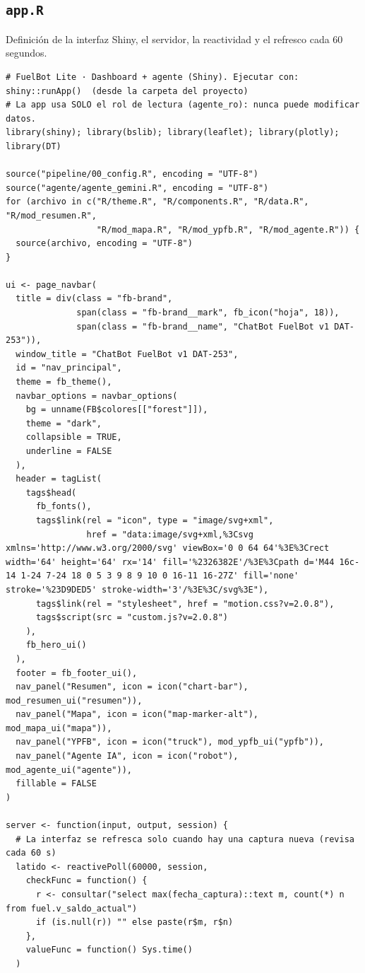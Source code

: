 \subsection{\texttt{app.R}}
Definición de la interfaz Shiny, el servidor, la reactividad y el refresco cada 60 segundos.
\begin{lstlisting}[style=anexoR]
# FuelBot Lite · Dashboard + agente (Shiny). Ejecutar con: shiny::runApp()  (desde la carpeta del proyecto)
# La app usa SOLO el rol de lectura (agente_ro): nunca puede modificar datos.
library(shiny); library(bslib); library(leaflet); library(plotly); library(DT)

source("pipeline/00_config.R", encoding = "UTF-8")
source("agente/agente_gemini.R", encoding = "UTF-8")
for (archivo in c("R/theme.R", "R/components.R", "R/data.R", "R/mod_resumen.R",
                  "R/mod_mapa.R", "R/mod_ypfb.R", "R/mod_agente.R")) {
  source(archivo, encoding = "UTF-8")
}

ui <- page_navbar(
  title = div(class = "fb-brand",
              span(class = "fb-brand__mark", fb_icon("hoja", 18)),
              span(class = "fb-brand__name", "ChatBot FuelBot v1 DAT-253")),
  window_title = "ChatBot FuelBot v1 DAT-253",
  id = "nav_principal",
  theme = fb_theme(),
  navbar_options = navbar_options(
    bg = unname(FB$colores[["forest"]]),
    theme = "dark",
    collapsible = TRUE,
    underline = FALSE
  ),
  header = tagList(
    tags$head(
      fb_fonts(),
      tags$link(rel = "icon", type = "image/svg+xml",
                href = "data:image/svg+xml,%3Csvg xmlns='http://www.w3.org/2000/svg' viewBox='0 0 64 64'%3E%3Crect width='64' height='64' rx='14' fill='%2326382E'/%3E%3Cpath d='M44 16c-14 1-24 7-24 18 0 5 3 9 8 9 10 0 16-11 16-27Z' fill='none' stroke='%23D9DED5' stroke-width='3'/%3E%3C/svg%3E"),
      tags$link(rel = "stylesheet", href = "motion.css?v=2.0.8"),
      tags$script(src = "custom.js?v=2.0.8")
    ),
    fb_hero_ui()
  ),
  footer = fb_footer_ui(),
  nav_panel("Resumen", icon = icon("chart-bar"), mod_resumen_ui("resumen")),
  nav_panel("Mapa", icon = icon("map-marker-alt"), mod_mapa_ui("mapa")),
  nav_panel("YPFB", icon = icon("truck"), mod_ypfb_ui("ypfb")),
  nav_panel("Agente IA", icon = icon("robot"), mod_agente_ui("agente")),
  fillable = FALSE
)

server <- function(input, output, session) {
  # La interfaz se refresca solo cuando hay una captura nueva (revisa cada 60 s)
  latido <- reactivePoll(60000, session,
    checkFunc = function() {
      r <- consultar("select max(fecha_captura)::text m, count(*) n from fuel.v_saldo_actual")
      if (is.null(r)) "" else paste(r$m, r$n)
    },
    valueFunc = function() Sys.time()
  )


\end{lstlisting}
